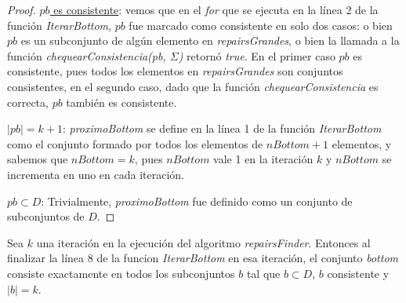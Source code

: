 \documentclass[11pt,a4paper,twoside]{tesis}
\begin{document}
\begin{proof}
\underline{$pb$ es consistente}: vemos que en el \textit{for} que se ejecuta en la línea 2 de la función \textit{IterarBottom}, $pb$ fue marcado como consistente en solo dos casos: o bien $pb$ es un subconjunto de algún elemento en \textit{repairsGrandes}, o bien la llamada a la función \textit{chequearConsistencia(pb, $\Sigma$)} retornó \textit{true}. En el primer caso $pb$ es consistente, pues todos los elementos en \textit{repairsGrandes} son conjuntos consistentes, en el segundo caso, dado que la función \textit{chequearConsistencia} es correcta, $pb$ también es consistente.

\underline{$|pb| = k + 1$}: \textit{proximoBottom} se define en la línea 1 de la función \textit{IterarBottom} como el conjunto formado por todos los elementos de $nBottom + 1$ elementos, y sabemos que $nBottom = k$, pues $nBottom$ vale 1 en la iteración $k$ y $nBottom$ se incrementa en uno en cada iteración.

\underline{$pb \subset D$}: Trivialmente, \textit{proximoBottom} fue definido como un conjunto de subconjuntos de $D$.
\end{proof}



\begin{lemma}\label{lemma_bottom}
Sea $k$ una iteración en la ejecución del algoritmo \textit{repairsFinder}. Entonces al finalizar la línea 8 de la funcion \textit{IterarBottom} en esa iteración, el conjunto  \textit{bottom} consiste exactamente en todos los subconjuntos $b$ tal que $b \subset D$, $b$ consistente y $|b| = k$.
\end{lemma}
\end{document}
